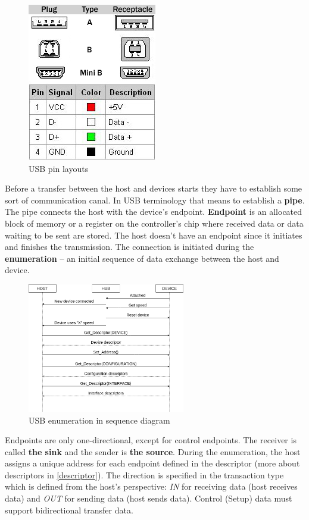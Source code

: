 \begin{figure}[ht]
    \centering
    \includegraphics{obrazky-figures/usb_pinouts.png}
    \caption{USB pin layouts}
    \label{fig:usb_pins}
\end{figure}

Before a transfer between the host and devices starts they have to establish some sort of communication canal. In USB terminology that means to establish a \textbf{pipe}. The pipe connects the host with the device's endpoint. \textbf{Endpoint} is an allocated block of memory or a register on the controller's chip where received data or data waiting to be sent are stored. The host doesn't have an endpoint since it initiates and finishes the transmission. The connection is initiated during the \textbf{enumeration} -- an initial sequence of data exchange between the host and device.

\begin{figure}[ht]
    \centering
    \includegraphics[width=260px]{obrazky-figures/enumeration.png}
    \caption{USB enumeration in sequence diagram}
    \label{fig:enumeration}
\end{figure}

Endpoints are only one-directional, except for control endpoints. The receiver is called \textbf{the sink} and the sender is \textbf{the source}. During the enumeration, the host assigns a unique address for each endpoint defined in the descriptor (more about descriptors in \autoref{descriptor}). The direction is specified in the transaction type which is defined from the host's perspective: \emph{IN} for receiving data (host receives data) and \emph{OUT} for sending data (host sends data). Control (Setup) data must support bidirectional transfer data.

